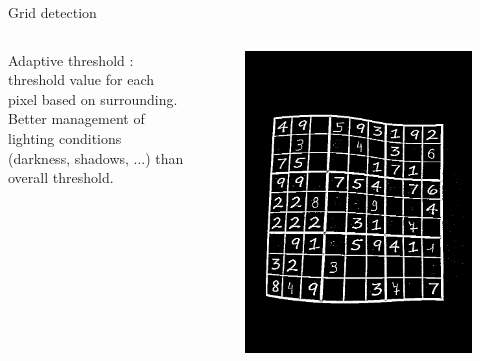 \documentclass[12pt, dvipsnames]{beamer}
\begin{document}
\begin{frame}{Grid detection}
    \begin{columns}
        \alert{Adaptive} threshold : threshold value for each pixel based on surrounding. \\[0.5em]
        
        Better management of lighting conditions (darkness, shadows, ...) than overall threshold.
        \begin{figure}
            \centering
            \includegraphics[width=1\textwidth]{resources/sudoku/sudoku_0025_02.jpg}
        \end{figure}
    \end{columns}
\end{frame}
\end{document}

